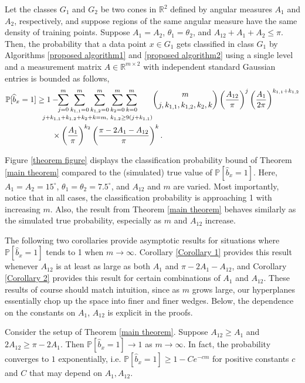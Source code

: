 \documentclass[twoside,11pt]{article}
\def \R {\mathbb{R}}
\newcommand{\edit}[1]{{{#1}}}
\begin{document}
\begin{theorem}\label{main theorem}
Let the classes $G_1$ and $G_2$ be two cones in $\R^2$ defined by angular measures $A_1$ and $A_2$, respectively, and suppose regions of the same angular measure have the same density of training points. Suppose $A_1 = A_2$, $\theta_1 = \theta_2$, and $A_{12} + A_1 + A_2 \leq \pi$. Then, the probability that a data point $x\in G_1$ gets classified in class $G_1$ by Algorithms \ref{proposed algorithm1} and \ref{proposed algorithm2} using a single \edit{level} and a measurement matrix $A\in\R^{m\times 2}$ with independent standard Gaussian entries is bounded as follows,
\begin{align}
\mathbb{P}[\widehat{b}_x = 1] &\geq 1 - \hspace{-8mm} \underset{j+k_{1,1}+k_{1,2}+k_2 + k = m, \,\, k_{1,2} \geq 9(j+k_{1,1})}{\sum_{j=0}^m \sum_{k_{1,1}=0}^m \sum_{k_{1,2}=0}^m \sum_{k_2=0}^m \sum_{k=0}^m} \binom{m}{j,k_{1,1},k_{1,2},k_2,k} \left(\frac{A_{12}}{\pi}\right)^j \left(\frac{A_1}{2\pi} \right)^{k_{1,1}+k_{1,2}}   \notag \\
&\quad\quad\times \left(\frac{A_1}{\pi} \right)^{k_2} \left(\frac{\pi-2A_1-A_{12}}{\pi}\right)^k. \label{RF3 bound multinomial complement}
\end{align}
\end{theorem}
Figure \ref{theorem figure} displays the classification probability bound of Theorem \ref{main theorem} compared to the (simulated) true value of $\mathbb{P}[\widehat{b}_x = 1]$. 
Here, $A_1 = A_2 = 15^\circ$, $\theta_1 = \theta_2 = 7.5^\circ$, and $A_{12}$ and $m$ are varied. Most importantly, notice that in all cases, the classification probability is approaching 1 with increasing $m$. Also, the result from Theorem \ref{main theorem} behaves similarly as the simulated true probability, especially as $m$ and $A_{12}$ increase.

The following two corollaries provide asymptotic results for situations where $\mathbb{P}[\widehat{b}_x = 1]$ tends to 1 when $m\rightarrow\infty$. Corollary \ref{Corollary 1} provides this result whenever $A_{12}$ is at least as large as both $A_1$ and $\pi-2A_1-A_{12}$, and Corollary \ref{Corollary 2} provides this result for certain combinations of $A_1$ and $A_{12}$.  \edit{These results of course should match intuition, since as $m$ grows large, our hyperplanes essentially chop up the space into finer and finer wedges. Below, the dependence on the constants on $A_1$, $A_{12}$ is explicit in the proofs.}

\begin{corollary}\label{Corollary 1}
Consider the setup of Theorem \ref{main theorem}. Suppose $A_{12} \geq A_1$ and \edit{$2A_{12} \geq \pi-2A_1$}. %
Then $\mathbb{P}[\widehat{b}_x = 1] \rightarrow 1$ as $m\rightarrow \infty$.  \edit{In fact, the probability converges to $1$ exponentially, i.e. $\mathbb{P}[\hat{b}_x =1] \geq 1-Ce^{-c m}$ for positive constants $c$ and $C$ that may depend on $A_1, A_{12}$.}
\end{corollary}
\end{document}
